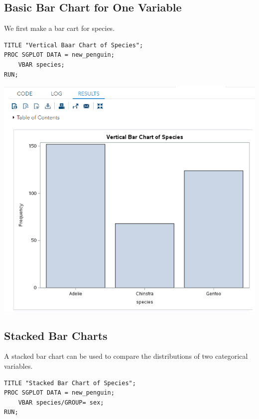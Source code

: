 \documentclass[
]{book}
\begin{document}
\hypertarget{basic-bar-chart-for-one-variable}{%
\subsection{Basic Bar Chart for One Variable}\label{basic-bar-chart-for-one-variable}}

We first make a bar cart for species.

\begin{verbatim}
TITLE "Vertical Baar Chart of Species";
PROC SGPLOT DATA = new_penguin;
    VBAR species; 
RUN;
\end{verbatim}

\begin{center}\includegraphics[width=1\linewidth]{img06/w06-VbarChart} \end{center}

\hypertarget{stacked-bar-charts}{%
\subsection{Stacked Bar Charts}\label{stacked-bar-charts}}

A stacked bar chart can be used to compare the distributions of two categorical variables.

\begin{verbatim}
TITLE "Stacked Bar Chart of Species";
PROC SGPLOT DATA = new_penguin;
    VBAR species/GROUP= sex; 
RUN;
\end{verbatim}
\end{document}
